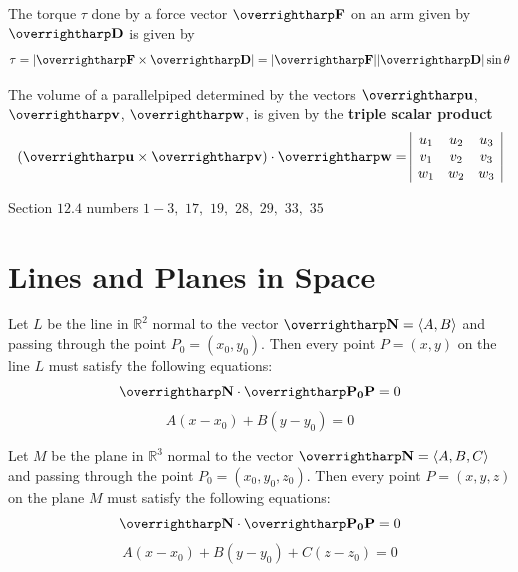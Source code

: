 \documentclass[letterpaper, twoside, 12pt]{book}
\begin{document}
          \begin{solution}

          \end{solution}



\begin{definition}
  The torque $\tau$ done by a force vector $\harpvec{F}$ on an arm given by
  $\harpvec{D}$ is given by
  \[
    \tau = |\harpvec{F} \times \harpvec{D}|
      =
    |\harpvec{F}||\harpvec{D}|\sin \theta
  \]
\end{definition}

\begin{theorem}
  The volume of a parallelpiped determined by the vectors
  $\harpvec{u}$, $\harpvec{v}$, $\harpvec{w}$, is given by
  the \textbf{triple scalar product}
    \[
      (\harpvec{u}\times\harpvec{v})\cdot\harpvec{w} =
      \begin{array}{|c c c|}
      u_1 & u_2 & u_3 \\
      v_1 & v_2 & v_3 \\
      w_1 & w_2 & w_3 \\
      \end{array}
    \]
\end{theorem}

\begin{suggestedHW}
  Section $12.4$ numbers $1 - 3,$ $17,$ $19,$ $28,$ $29,$ $33,$ $35$
\end{suggestedHW}



\section{Lines and Planes in Space}

\begin{theorem}
  Let $L$ be the line in $\mathbb R^2$ normal to the vector $\harpvec N=\<A,B\>$
  and passing through the point $P_0=(x_0,y_0)$. Then every point $P=(x,y)$
  on the line $L$ must satisfy the following equations:
  \[
    \harpvec N \cdot \harpvec{P_0P} = 0
  \]
  \[
    A(x-x_0) + B(y-y_0) = 0
  \]

  Let $M$ be the plane in $\mathbb R^3$ normal to the vector $\harpvec N=\<A,B,C\>$
  and passing through the point $P_0=(x_0,y_0,z_0)$. Then every point $P=(x,y,z)$
  on the plane $M$ must satisfy the following equations:
  \[
    \harpvec N \cdot \harpvec{P_0P} = 0
  \]
  \[
    A(x-x_0) + B(y-y_0) + C(z-z_0) = 0
  \]
\end{theorem}
\end{document}
